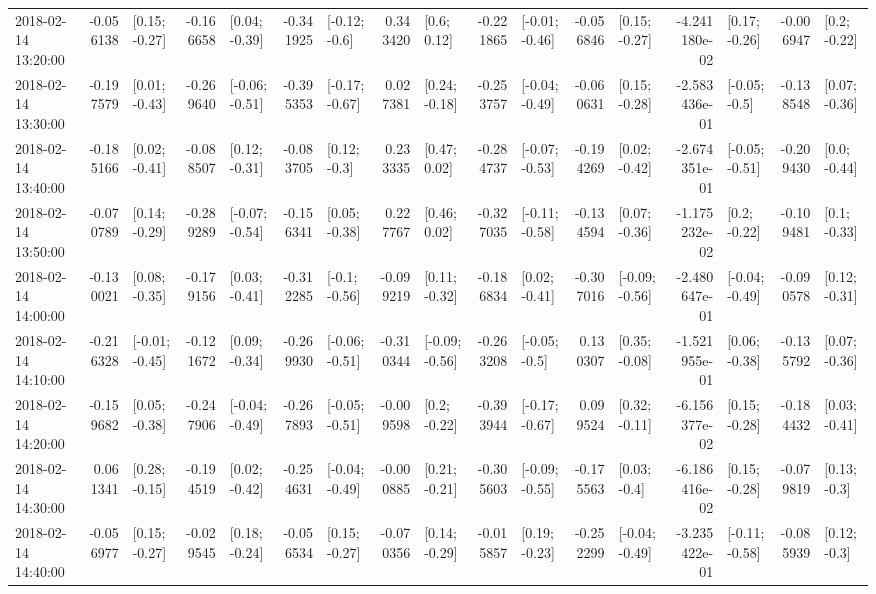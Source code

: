 \begin{tabular}{lrlrlrlrlrlrlrlrl}
2018-02-14 13:20:00 & -0.056138 &   [0.15; -0.27] & -0.166658 &   [0.04; -0.39] & -0.341925 &   [-0.12; -0.6] &  0.343420 &     [0.6; 0.12] & -0.221865 &  [-0.01; -0.46] & -0.056846 &   [0.15; -0.27] & -4.241180e-02 &   [0.17; -0.26] & -0.006947 &    [0.2; -0.22] \\
2018-02-14 13:30:00 & -0.197579 &   [0.01; -0.43] & -0.269640 &  [-0.06; -0.51] & -0.395353 &  [-0.17; -0.67] &  0.027381 &   [0.24; -0.18] & -0.253757 &  [-0.04; -0.49] & -0.060631 &   [0.15; -0.28] & -2.583436e-01 &   [-0.05; -0.5] & -0.138548 &   [0.07; -0.36] \\
2018-02-14 13:40:00 & -0.185166 &   [0.02; -0.41] & -0.088507 &   [0.12; -0.31] & -0.083705 &    [0.12; -0.3] &  0.233335 &    [0.47; 0.02] & -0.284737 &  [-0.07; -0.53] & -0.194269 &   [0.02; -0.42] & -2.674351e-01 &  [-0.05; -0.51] & -0.209430 &    [0.0; -0.44] \\
2018-02-14 13:50:00 & -0.070789 &   [0.14; -0.29] & -0.289289 &  [-0.07; -0.54] & -0.156341 &   [0.05; -0.38] &  0.227767 &    [0.46; 0.02] & -0.327035 &  [-0.11; -0.58] & -0.134594 &   [0.07; -0.36] & -1.175232e-02 &    [0.2; -0.22] & -0.109481 &    [0.1; -0.33] \\
2018-02-14 14:00:00 & -0.130021 &   [0.08; -0.35] & -0.179156 &   [0.03; -0.41] & -0.312285 &   [-0.1; -0.56] & -0.099219 &   [0.11; -0.32] & -0.186834 &   [0.02; -0.41] & -0.307016 &  [-0.09; -0.56] & -2.480647e-01 &  [-0.04; -0.49] & -0.090578 &   [0.12; -0.31] \\
2018-02-14 14:10:00 & -0.216328 &  [-0.01; -0.45] & -0.121672 &   [0.09; -0.34] & -0.269930 &  [-0.06; -0.51] & -0.310344 &  [-0.09; -0.56] & -0.263208 &   [-0.05; -0.5] &  0.130307 &   [0.35; -0.08] & -1.521955e-01 &   [0.06; -0.38] & -0.135792 &   [0.07; -0.36] \\
2018-02-14 14:20:00 & -0.159682 &   [0.05; -0.38] & -0.247906 &  [-0.04; -0.49] & -0.267893 &  [-0.05; -0.51] & -0.009598 &    [0.2; -0.22] & -0.393944 &  [-0.17; -0.67] &  0.099524 &   [0.32; -0.11] & -6.156377e-02 &   [0.15; -0.28] & -0.184432 &   [0.03; -0.41] \\
2018-02-14 14:30:00 &  0.061341 &   [0.28; -0.15] & -0.194519 &   [0.02; -0.42] & -0.254631 &  [-0.04; -0.49] & -0.000885 &   [0.21; -0.21] & -0.305603 &  [-0.09; -0.55] & -0.175563 &    [0.03; -0.4] & -6.186416e-02 &   [0.15; -0.28] & -0.079819 &    [0.13; -0.3] \\
2018-02-14 14:40:00 & -0.056977 &   [0.15; -0.27] & -0.029545 &   [0.18; -0.24] & -0.056534 &   [0.15; -0.27] & -0.070356 &   [0.14; -0.29] & -0.015857 &   [0.19; -0.23] & -0.252299 &  [-0.04; -0.49] & -3.235422e-01 &  [-0.11; -0.58] & -0.085939 &    [0.12; -0.3] \\

\end{tabular}
